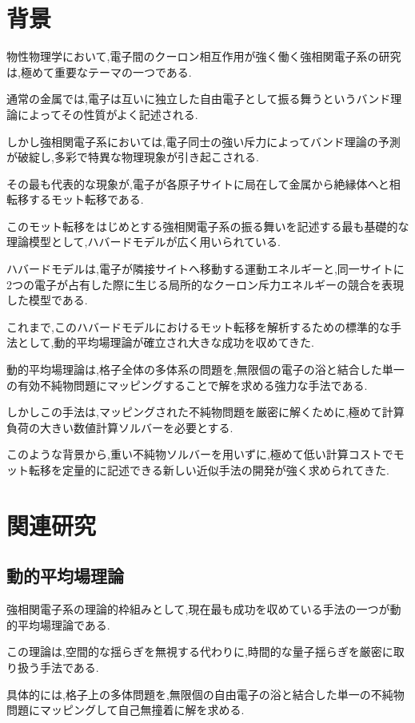 \section{背景}

物性物理学において,電子間のクーロン相互作用が強く働く強相関電子系の研究は,極めて重要なテーマの一つである.

通常の金属では,電子は互いに独立した自由電子として振る舞うというバンド理論によってその性質がよく記述される.

しかし強相関電子系においては,電子同士の強い斥力によってバンド理論の予測が破綻し,多彩で特異な物理現象が引き起こされる.

その最も代表的な現象が,電子が各原子サイトに局在して金属から絶縁体へと相転移するモット転移である.

このモット転移をはじめとする強相関電子系の振る舞いを記述する最も基礎的な理論模型として,ハバードモデルが広く用いられている.

ハバードモデルは,電子が隣接サイトへ移動する運動エネルギーと,同一サイトに2つの電子が占有した際に生じる局所的なクーロン斥力エネルギーの競合を表現した模型である.

これまで,このハバードモデルにおけるモット転移を解析するための標準的な手法として,動的平均場理論が確立され大きな成功を収めてきた.

動的平均場理論は,格子全体の多体系の問題を,無限個の電子の浴と結合した単一の有効不純物問題にマッピングすることで解を求める強力な手法である.

しかしこの手法は,マッピングされた不純物問題を厳密に解くために,極めて計算負荷の大きい数値計算ソルバーを必要とする.

このような背景から,重い不純物ソルバーを用いずに,極めて低い計算コストでモット転移を定量的に記述できる新しい近似手法の開発が強く求められてきた.

\section{関連研究}

\subsection{動的平均場理論}

強相関電子系の理論的枠組みとして,現在最も成功を収めている手法の一つが動的平均場理論である.

この理論は,空間的な揺らぎを無視する代わりに,時間的な量子揺らぎを厳密に取り扱う手法である.

具体的には,格子上の多体問題を,無限個の自由電子の浴と結合した単一の不純物問題にマッピングして自己無撞着に解を求める.

